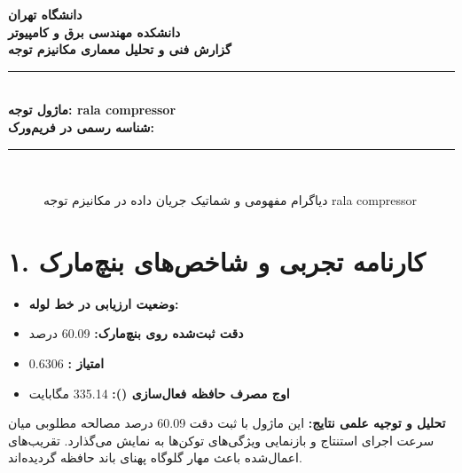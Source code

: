 \documentclass[12pt,a4paper]{article}
\begin{document}
\begin{center}
{\Large\bfseries دانشگاه تهران}\\[0.2cm]
{\large\bfseries دانشکده مهندسی برق و کامپیوتر}\\[0.2cm]
{\large\bfseries گزارش فنی و تحلیل معماری مکانیزم توجه}\\[0.5cm]
\rule{\linewidth}{1pt}\\[0.3cm]
{\LARGE\bfseries ماژول توجه: rala compressor}\\[0.2cm]
{\large \textbf{شناسه رسمی در فریم‌ورک:} }\\[0.2cm]
\rule{\linewidth}{1pt}\\[0.5cm]
\end{center}

\begin{figure}[H]
\centering
{}
\caption{دیاگرام مفهومی و شماتیک جریان داده در مکانیزم توجه rala compressor}
\end{figure}

\section*{۱. کارنامه تجربی و شاخص‌های بنچ‌مارک}
\begin{itemize}
\item \textbf{وضعیت ارزیابی در خط لوله:} 
\item \textbf{دقت ثبت‌شده روی بنچ‌مارک:} 60.09 درصد
\item \textbf{امتیاز :} 0.6306
\item \textbf{اوج مصرف حافظه فعال‌سازی ():} 335.14 مگابایت
\end{itemize}
\textbf{تحلیل و توجیه علمی نتایج:} این ماژول با ثبت دقت 60.09 درصد مصالحه مطلوبی میان سرعت اجرای استنتاج و بازنمایی ویژگی‌های توکن‌ها به نمایش می‌گذارد. تقریب‌های اعمال‌شده باعث مهار گلوگاه پهنای باند حافظه گردیده‌اند.
\end{document}
